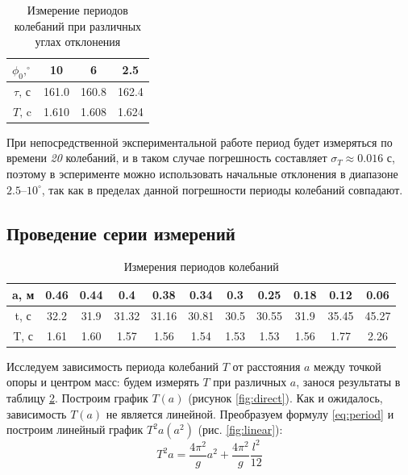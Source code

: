             \begin{table}[h]
                \centering
                \begin{tabular}{|c|c|c|c|}
                    \hline
                    $\phi_0, ^\circ$ & 10 & 6 & 2.5 \\
                    \hline
                    $\tau\text{, с}$ & 161.0 & 160.8 & 162.4 \\
                    \hline
                    $T\text{, c}$ & 1.610 & 1.608 & 1.624 \\
                    \hline
                \end{tabular}
                \caption{Измерение периодов колебаний при различных углах отклонения}
                \label{table:angles}   
            \end{table}

            При непосредственной экспериментальной работе период будет измеряться по времени \emph{20} колебаний, и в таком случае погрешность составляет \underline{$\sigma_T \approx 0.016\text{ с}$}, поэтому в эсперименте можно использовать начальные отклонения в диапазоне $2.5$--$10^\circ$, так как в пределах данной погрешности периоды колебаний совпадают.

        \subsection{Проведение серии измерений}
            \begin{table}
                \centering
                \begin{tabular}{|c|c|c|c|c|c|c|c|c|c|c|}
                    \hline
                    a, м & 0.46 & 0.44 & 0.4 & 0.38 & 0.34 & 0.3 & 0.25 & 0.18 & 0.12 & 0.06 \\
                    \hline
                    t, с & 32.2 & 31.9 & 31.32 & 31.16 & 30.81 & 30.5 & 30.55 & 31.9 & 35.45 & 45.27 \\
                    \hline
                    T, с & 1.61 & 1.60 & 1.57 & 1.56 & 1.54 & 1.53 & 1.53 & 1.56 & 1.77 & 2.26 \\
                    \hline
                \end{tabular}
                \caption{Измерения периодов колебаний}
                \label{table:periods}
            \end{table}

            Исследуем зависимость периода колебаний $T$ от расстояния $a$ между точкой опоры и центром масс: будем измерять $T$ при различных $a$, занося результаты в таблицу \ref{table:periods}. Построим график $T(a)$ (рисунок \ref{fig:direct}). Как и ожидалось, зависимость $T(a)$ не является линейной. Преобразуем формулу \ref{eq:period} и построим линейный график $T^2a\left(a^2\right)$ (рис. \ref{fig:linear}):
            \begin{equation}
                T^2a = \frac{4\pi^2}{g}a^2 + \frac{4\pi^2}{g}\frac{l^2}{12}
            \end{equation}


